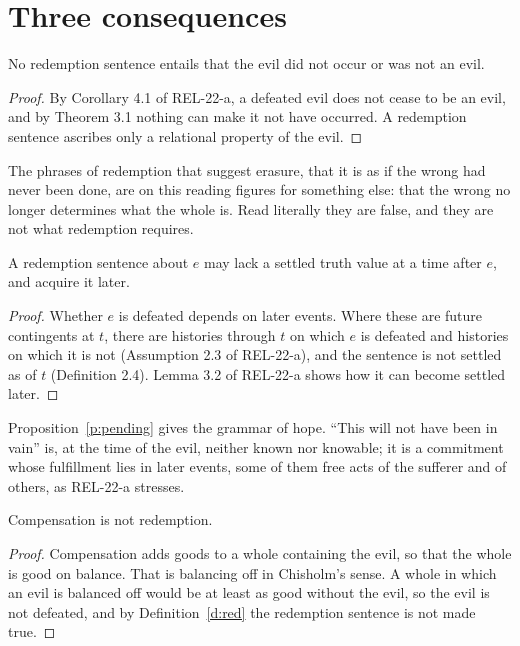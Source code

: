 \documentclass{situationist-preprint}
\begin{document}
\section{Three consequences}

\begin{proposition}\label{p:erase}
No redemption sentence entails that the evil did not occur or was not an evil.
\end{proposition}

\begin{proof}
By Corollary 4.1 of REL-22-a, a defeated evil does not cease to be an evil, and by Theorem 3.1 nothing can make it not have occurred. A redemption sentence ascribes only a relational property of the evil.
\end{proof}

The phrases of redemption that suggest erasure, that it is as if the wrong had never been done, are on this reading figures for something else: that the wrong no longer determines what the whole is. Read literally they are false, and they are not what redemption requires.

\begin{proposition}\label{p:pending}
A redemption sentence about $e$ may lack a settled truth value at a time after $e$, and acquire it later.
\end{proposition}

\begin{proof}
Whether $e$ is defeated depends on later events. Where these are future contingents at $t$, there are histories through $t$ on which $e$ is defeated and histories on which it is not (Assumption 2.3 of REL-22-a), and the sentence is not settled as of $t$ (Definition 2.4). Lemma 3.2 of REL-22-a shows how it can become settled later.
\end{proof}

Proposition~\ref{p:pending} gives the grammar of hope. \enquote{This will not have been in vain} is, at the time of the evil, neither known nor knowable; it is a commitment whose fulfillment lies in later events, some of them free acts of the sufferer and of others, as REL-22-a stresses.

\begin{proposition}\label{p:comp}
Compensation is not redemption.
\end{proposition}

\begin{proof}
Compensation adds goods to a whole containing the evil, so that the whole is good on balance. That is balancing off in Chisholm's sense. A whole in which an evil is balanced off would be at least as good without the evil, so the evil is not defeated, and by Definition~\ref{d:red} the redemption sentence is not made true.
\end{proof}
\end{document}
